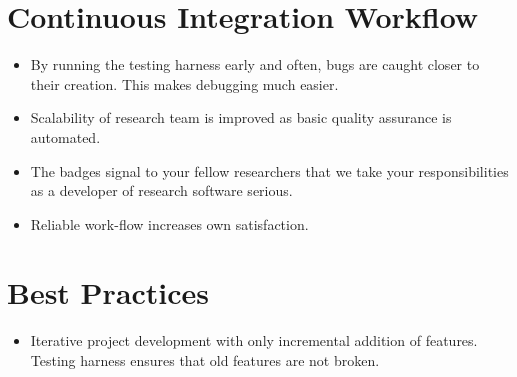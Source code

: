 \section{Continuous Integration Workflow}
\begin{itemize}
\item By running the testing harness early and often, bugs are caught closer to their creation. This makes debugging much easier. 
\item Scalability of research team is improved as basic quality assurance is automated.
\item The badges signal to your fellow researchers that we take your responsibilities as a developer of research software serious.
\item  Reliable work-flow increases own satisfaction.
\end{itemize}

\section{Best Practices}
\begin{itemize}
\item Iterative project development with only incremental addition of features. Testing harness ensures that old features are not broken.
\end{itemize}


